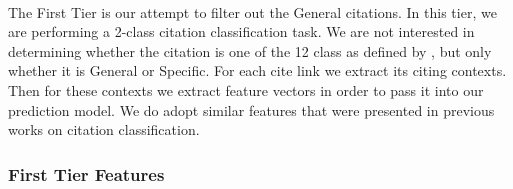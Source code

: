 \paragraph{}
The First Tier is our attempt to filter out the General citations. In this tier, we are performing a 2-class citation classification task. We are not interested in determining whether the citation is one of the 12 class as defined by \cite{teufel2009annotation}, but only whether it is General or Specific. For each cite link we extract its citing contexts. Then for these contexts we extract feature vectors in order to pass it into our prediction model. We do adopt similar features that were presented in previous works on citation classification.

\subsubsection{First Tier Features}
